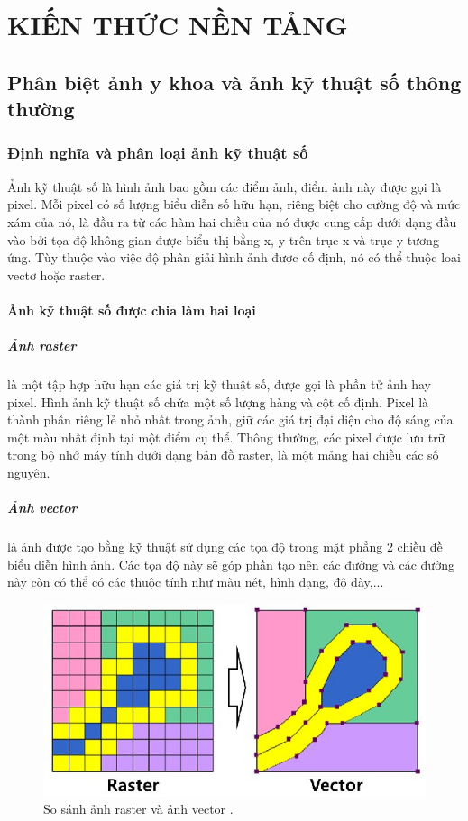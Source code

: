 \chapter{KIẾN THỨC NỀN TẢNG}\label{chapter:knowledge}
\section{Phân biệt ảnh y khoa và ảnh kỹ thuật số thông thường}

\subsection{Định nghĩa và phân loại ảnh kỹ thuật số}
Ảnh kỹ thuật số là hình ảnh bao gồm các điểm ảnh, điểm ảnh này được gọi là pixel. Mỗi pixel có số lượng biểu diễn số hữu hạn, riêng biệt cho cường độ và mức xám của nó, là đầu ra từ các hàm hai chiều của nó được cung cấp dưới dạng đầu vào bởi tọa độ không gian được biểu thị bằng x, y trên trục x và trục y tương ứng. Tùy thuộc vào việc độ phân giải hình ảnh được cố định, nó có thể thuộc loại vectơ hoặc raster.

\subsubsection{Ảnh kỹ thuật số được chia làm hai loại}
\paragraph{Ảnh raster}là một tập hợp hữu hạn các giá trị kỹ thuật số, được gọi là phần tử ảnh hay pixel. Hình ảnh kỹ thuật số chứa một số lượng hàng và cột cố định. Pixel là thành phần riêng lẻ nhỏ nhất trong ảnh, giữ các giá trị đại diện cho độ sáng của một màu nhất định tại một điểm cụ thể. Thông thường, các pixel được lưu trữ trong bộ nhớ máy tính dưới dạng bản đồ raster, là một mảng hai chiều các số nguyên.
\vspace{-0.7cm}
\paragraph{Ảnh vector}là ảnh được tạo bằng kỹ thuật sử dụng các tọa độ trong mặt phẳng 2 chiều đề biểu diễn hình ảnh. Các tọa độ này sẽ góp phần tạo nên các đường và các đường này còn có thể có các thuộc tính như màu nét, hình dạng, độ dày,...
\newpage
\begin{figure}[H]
    \centering
    \includegraphics[scale=1.2]{images/medicine/img8.jpg}
    \caption{So sánh ảnh raster và ảnh vector \cite{WinNT2}.}
\end{figure}

